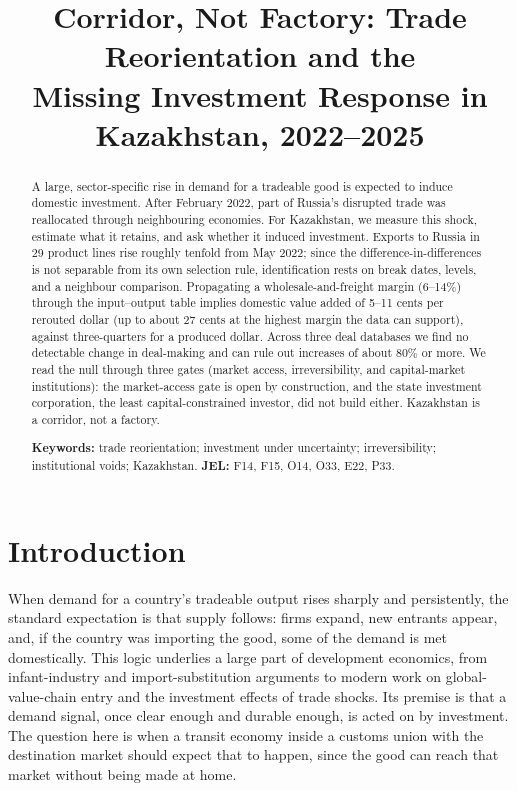 \documentclass[12pt]{article}
\title{Corridor, Not Factory: Trade Reorientation and the\\
Missing Investment Response in Kazakhstan, 2022--2025}
\author{}
\date{}
\begin{document}
\maketitle

\begin{abstract}
\noindent A large, sector-specific rise in demand for a tradeable good is expected to induce
domestic investment. After February 2022, part of Russia's disrupted trade was reallocated
through neighbouring economies. For Kazakhstan, we measure this shock, estimate what it
retains, and ask whether it induced investment. Exports to Russia in 29 product lines rise
roughly tenfold from May 2022; since the difference-in-differences is not separable from its
own selection rule, identification rests on break dates, levels, and a neighbour comparison.
Propagating a wholesale-and-freight margin (6--14\%) through the input--output table implies
domestic value added of 5--11 cents per rerouted dollar (up to about 27 cents at the highest margin the data can support), against three-quarters for a produced dollar. Across three deal databases we find no detectable change in deal-making and can rule out increases of about 80\% or more. We read the null through three gates (market access, irreversibility, and capital-market institutions): the market-access gate is open by construction, and the state investment corporation, the least capital-constrained investor, did not build either.
Kazakhstan is a corridor, not a factory.

\medskip
\noindent\textbf{Keywords:} trade reorientation; investment under uncertainty; irreversibility;
institutional voids; Kazakhstan.
\quad\textbf{JEL:} F14, F15, O14, O33, E22, P33.
\end{abstract}

\clearpage

\section{Introduction}

When demand for a country's tradeable output rises sharply and persistently, the standard expectation is that supply follows: firms expand, new entrants appear, and, if the country
was importing the good, some of the demand is met domestically. This logic underlies a large part of development economics, from infant-industry and import-substitution arguments to modern work on global-value-chain entry and the investment effects of trade shocks. Its premise is that a demand signal, once clear enough and durable enough, is acted on by investment. The question here is when a transit economy inside a customs union with the destination market should expect that to happen, since the good can reach that market without being made at home.
\end{document}
